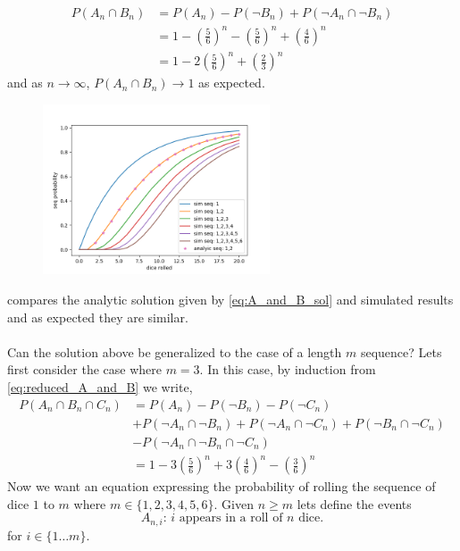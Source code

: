 \documentclass[12pt,a4paper]{article}
\begin{document}
\begin{align}
P(A_n \cap B_n) &= P(A_n) - P(\neg B_n) + P(\neg A_n \cap \neg B_n)\\
                &=  1-\left(\frac{5}{6}\right)^n -\left(\frac{5}{6}\right)^n + \left(\frac{4}{6}\right)^n\\
                &= 1 - 2\left(\frac{5}{6}\right)^n + \left(\frac{2}{3}\right)^n
\label{eq:A_and_B_sol}
\end{align}
and as $n\to\infty$, $P(A_n \cap B_n) \to 1$ as expected.\\

\begin{figure}[H]
    \centering
    \includegraphics[width=0.6\textwidth]{figs/compare_analytic_sim.png}
    \caption{}
    \label{fig:compare_analytic_sim}
\end{figure}
 compares the analytic solution given by \cref{eq:A_and_B_sol} and simulated results and as expected they are similar.\\

\hrulefill\\

Can the solution above be generalized to the case of a length $m$ sequence? Lets first consider the case where $m=3$. In this case, by induction from \cref{eq:reduced_A_and_B} we write,\\

\begin{align}
P(A_n \cap B_n \cap C_n)    &= P(A_n) - P(\neg B_n) - P(\neg C_n)\\
                            &+ P(\neg A_n \cap \neg B_n) + P(\neg A_n \cap \neg C_n) + P(\neg B_n \cap \neg C_n)\\ 
                            &- P(\neg A_n \cap \neg B_n \cap \neg C_n)\\
                            &= 1 - 3\left(\frac{5}{6}\right)^n + 3\left(\frac{4}{6}\right)^n - \left(\frac{3}{6}\right)^n
\label{eq:A_and_B_and_C_sol}
\end{align}
Now we want an equation expressing the probability of rolling the sequence of dice $1$ to $m$ where $m\in\{1,2,3,4,5,6\}$. Given $n\geq m$ lets define the events
\begin{equation}
A_{n,i} \text{: $i$ appears in a roll of $n$ dice.}
\end{equation}
for $i \in \{1\ldots m\}$.\\
\end{document}
